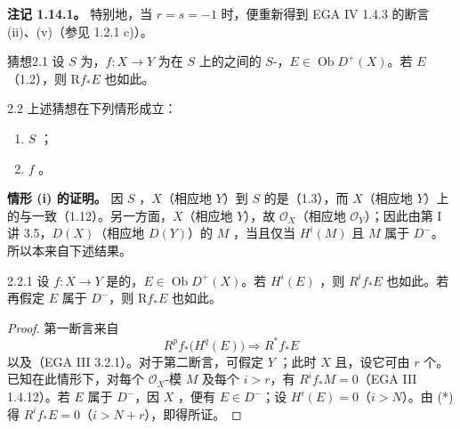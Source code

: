 \textbf{注记 1.14.1。} 特别地，当 $r=s=-1$ 时，便重新得到 EGA IV 1.4.3 的断言 (ii)、(v)（参见 1.2.1 c)）。
\begin{SGAresult}{猜想}{2.1}
设 $S$ 为，$f:X\to Y$ 为在 $S$ 上的之间的 $S$-，$E\in\operatorname{Ob}D^+(X)$。若 $E$ （1.2），则 $\mathrm Rf_*E$ 也如此。
\end{SGAresult}
\begin{SGAresult}{}{2.2}
上述猜想在下列情形成立：
\begin{enumerate}\item[(i)] $S$ ；\item[(ii)] $f$ 。\end{enumerate}
\end{SGAresult}
\textbf{情形 (i) 的证明。} 因 $S$ ，$X$（相应地 $Y$）到 $S$ 的是（1.3），而 $X$（相应地 $Y$）上的与一致（1.12）。另一方面，$X$（相应地 $Y$），故 $\mathcal O_X$（相应地 $\mathcal O_Y$）；因此由第 I 讲 3.5，$D(X)$（相应地 $D(Y)$）的 $M$ ，当且仅当 $H^i(M)$ 且 $M$ 属于 $D^-$。所以本来自下述结果。
\begin{SGAresult}{}{2.2.1}
设 $f:X\to Y$ 是的，$E\in\operatorname{Ob}D^+(X)$。若 $H^i(E)$ ，则 $R^if_*E$ 也如此。若再假定 $E$ 属于 $D^-$，则 $\mathrm Rf_*E$ 也如此。
\end{SGAresult}
\begin{proof}
第一断言来自
\[R^pf_*\bigl(H^q(E)\bigr)\Longrightarrow R^*f_*E\tag{*}\]
以及（EGA III 3.2.1）。对于第二断言，可假定 $Y$ ；此时 $X$ 且，设它可由 $r$ 个。已知在此情形下，对每个 $\mathcal O_X$-模 $M$ 及每个 $i>r$，有 $R^if_*M=0$（EGA III 1.4.12）。若 $E$ 属于 $D^-$，因 $X$ ，便有 $E\in D^-$；设 $H^i(E)=0$（$i>N$）。由 (*) 得 $R^if_*E=0$（$i>N+r$），即得所证。
\end{proof}
